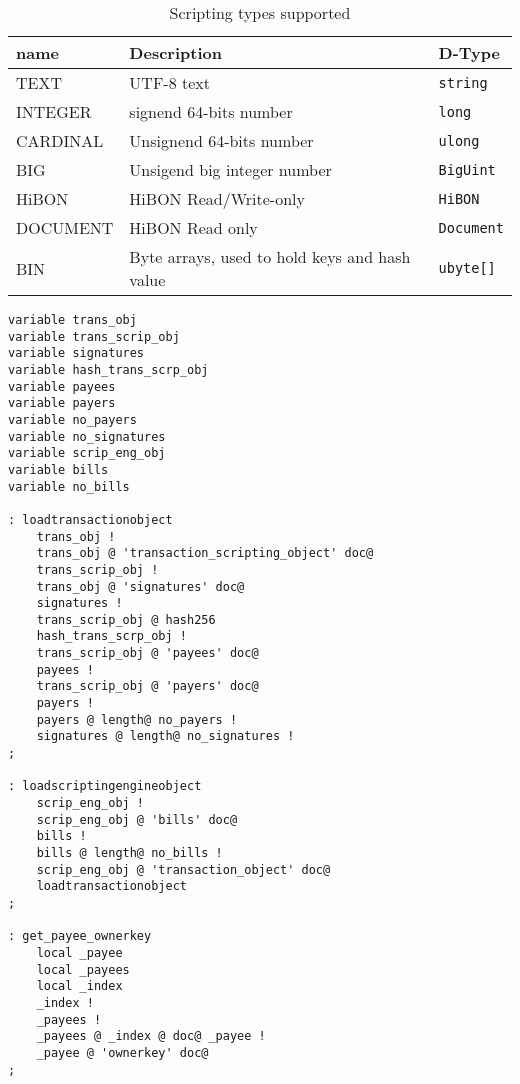 \begin{table}[H]
\begin{center}
\begin{tabular}{|l|l|l|}
\hline
name & Description & D-Type \\
\hline
TEXT & UTF-8 text & \texttt{string} \\
\hline
INTEGER & signend 64-bits number &  \texttt{long} \\
\hline
CARDINAL & Unsignend 64-bits number & \texttt{ulong} \\
\hline
BIG & Unsigend big integer number & \texttt{BigUint}  \\
\hline
HiBON & HiBON Read/Write-only & \texttt{HiBON} \\
\hline
DOCUMENT & HiBON Read only & \texttt{Document} \\
\hline
BIN & Byte arrays, used to hold keys and hash value & \texttt{ubyte[]} \\
\hline
\end{tabular}
\end{center}
\caption{Scripting types supported}
\label{tab:script_types}
\end{table}


\lstset{language=bash, numbers=left, numberstyle=\tiny, stepnumber=1, numbersep=5pt, tabsize=4}

\begin{lstlisting}
variable trans_obj
variable trans_scrip_obj
variable signatures
variable hash_trans_scrp_obj
variable payees
variable payers
variable no_payers
variable no_signatures
variable scrip_eng_obj
variable bills
variable no_bills

: loadtransactionobject
    trans_obj !
    trans_obj @ 'transaction_scripting_object' doc@
    trans_scrip_obj !
    trans_obj @ 'signatures' doc@
    signatures !
    trans_scrip_obj @ hash256
    hash_trans_scrp_obj !
    trans_scrip_obj @ 'payees' doc@
    payees !
    trans_scrip_obj @ 'payers' doc@
    payers !
    payers @ length@ no_payers !
    signatures @ length@ no_signatures !
;

: loadscriptingengineobject
    scrip_eng_obj !
    scrip_eng_obj @ 'bills' doc@
    bills !
    bills @ length@ no_bills !
    scrip_eng_obj @ 'transaction_object' doc@
    loadtransactionobject
;

: get_payee_ownerkey
    local _payee
    local _payees
    local _index
    _index !
    _payees !
    _payees @ _index @ doc@ _payee !
    _payee @ 'ownerkey' doc@
;

\end{lstlisting}
